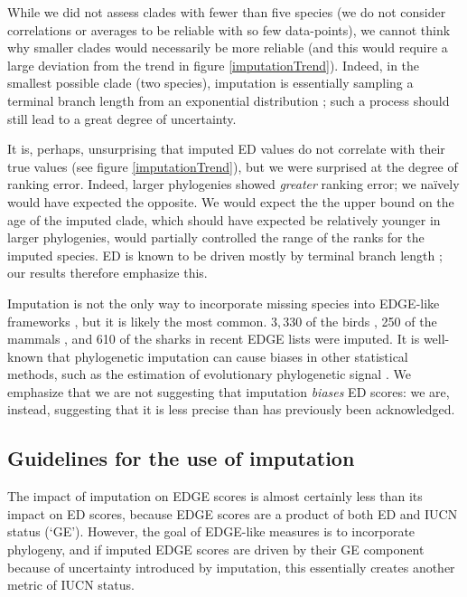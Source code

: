 \documentclass[10pt,english]{article}
\begin{document}
While we did not assess clades with fewer than five species (we do not consider
correlations or averages to be reliable with so few data-points), we cannot
think why smaller clades would necessarily be more reliable (and this would
require a large deviation from the trend in figure \ref{imputationTrend}).
Indeed, in the smallest possible clade (two species), imputation is essentially
sampling a terminal branch length from an exponential distribution
\autocite{Kuhn2011}; such a process should still lead to a great degree of
uncertainty. 

It is, perhaps, unsurprising that imputed ED values do not correlate with their
true values (see figure \ref{imputationTrend}), but we were surprised at the
degree of ranking error. Indeed, larger phylogenies showed \emph{greater}
ranking error; we na\"{i}vely would have expected the opposite. We would expect
the the upper bound on the age of the imputed clade, which should have expected
be relatively younger in larger phylogenies, would partially controlled the
range of the ranks for the imputed species. ED is known to be driven mostly by
terminal branch length \autocite{Isaac2007, Steel2007, Redding2008}; our results
therefore emphasize this.

Imputation is not the only way to incorporate missing species into EDGE-like
frameworks \autocite[see][]{Collen2011,Gumbs2018}, but it is likely the most
common. $3,330$ of the birds \autocite[\textasciitilde30\%;][]{Jetz2014}, 250 of
the mammals \autocite[\textasciitilde 5.6\%;][]{Collen2011}, and 610 of the
sharks \autocite[\textasciitilde49\%;][]{Stein2018} in recent EDGE lists were
imputed. It is well-known that phylogenetic imputation can cause biases in other
statistical methods, such as the estimation of evolutionary phylogenetic signal
\autocite{Rabosky2015}. We emphasize that we are not suggesting that imputation
\emph{biases} ED scores: we are, instead, suggesting that it is less precise
than has previously been acknowledged.

\subsection*{Guidelines for the use of imputation}
The impact of imputation on EDGE scores is almost certainly less than its impact
on ED scores, because EDGE scores are a product of both ED and IUCN status
(‘GE'). However, the goal of EDGE-like measures is to incorporate phylogeny, and
if imputed EDGE scores are driven by their GE component because of uncertainty
introduced by imputation, this essentially creates another metric of IUCN
status.
\end{document}
